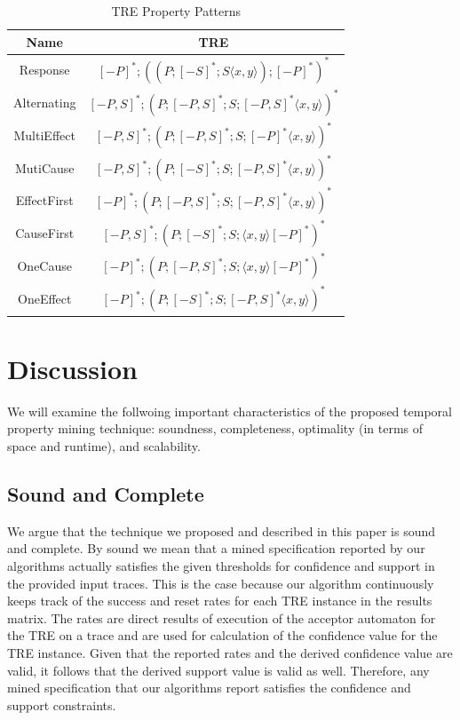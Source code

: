 \documentclass[]{sigplanconf}
\begin{document}
\begin{table}[ht]
  \centering
  \begin{tabular}{|c|c|}
  \hline
  \textbf{Name} & \textbf{TRE}  \\ \hline
  Response      & $[-P]^*;((P;[-S]^*;S \langle x,y \rangle);[-P]^*)^*$        \\ \hline
  Alternating   & $[-P,S]^*;(P;[-P,S]^*;S;[-P,S]^* \langle x,y \rangle)^*$       \\ \hline
  MultiEffect   &  $[-P,S]^*;(P;[-P,S]^*;S;[-P]^* \langle x,y \rangle)^*$     \\ \hline
  MutiCause     &  $[-P,S]^*;(P;[-S]^*;S;[-P,S]^* \langle x,y \rangle)^*$     \\ \hline
  EffectFirst   &  $[-P]^*;(P;[-P,S]^*;S;[-P,S]^* \langle x,y \rangle)^*$      \\ \hline
  CauseFirst    &  $[-P,S]^*;(P;[-S]^*;S;\langle x,y \rangle [-P]^*)^*$       \\ \hline
  OneCause      &  $[-P]^*;(P;[-P,S]^*;S;\langle x,y \rangle [-P]^*)^*$       \\ \hline
  OneEffect     &  $[-P]^*;(P;[-S]^*;S;[-P,S]^* \langle x,y \rangle)^*$       \\ \hline
\end{tabular}
\caption{TRE Property Patterns}\label{TRE_Exp}
\end{table}


\section{Discussion} \label{discussion}

We will examine the follwoing important characteristics of the proposed temporal property mining technique: soundness, completeness, optimality (in terms of space and runtime), and scalability.


\subsection{Sound and Complete}

We argue that the technique we proposed and described in this paper is sound and complete. By sound we mean that a mined specification reported by our algorithms actually satisfies the given thresholds for confidence and support in the provided input traces. This is the case because our algorithm continuously keeps track of the success and reset rates for each TRE instance in the results matrix. The rates are direct results of execution of the acceptor automaton for the TRE on a trace and are used for calculation of the confidence value for the TRE instance. Given that the reported rates and the derived confidence value are valid, it follows that the derived support value is valid as well. Therefore, any mined specification that our algorithms report satisfies the confidence and support constraints.
\end{document}
